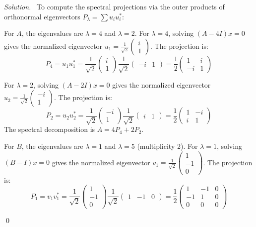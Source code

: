 \documentclass[12pt,a4paper]{article}
\newenvironment{solution}{%
  \par\noindent\textit{Solution.}\ }{\qed}
\theoremstyle{problemstyle}
\begin{document}
\begin{solution}
To compute the spectral projections via the outer products of orthonormal eigenvectors \( P_{\lambda} = \sum u_i u_i^* \):

For \( A \), the eigenvalues are \( \lambda = 4 \) and \( \lambda = 2 \).
For \( \lambda = 4 \), solving \( (A - 4I)x = 0 \) gives the normalized eigenvector \( u_1 = \frac{1}{\sqrt{2}}\begin{pmatrix} i \\ 1 \end{pmatrix} \). The projection is:
\[ P_4 = u_1 u_1^* = \frac{1}{\sqrt{2}}\begin{pmatrix} i \\ 1 \end{pmatrix} \frac{1}{\sqrt{2}}\begin{pmatrix} -i & 1 \end{pmatrix} = \frac{1}{2} \begin{pmatrix} 1 & i \\ -i & 1 \end{pmatrix} \]

For \( \lambda = 2 \), solving \( (A - 2I)x = 0 \) gives the normalized eigenvector \( u_2 = \frac{1}{\sqrt{2}}\begin{pmatrix} -i \\ 1 \end{pmatrix} \). The projection is:
\[ P_2 = u_2 u_2^* = \frac{1}{\sqrt{2}}\begin{pmatrix} -i \\ 1 \end{pmatrix} \frac{1}{\sqrt{2}}\begin{pmatrix} i & 1 \end{pmatrix} = \frac{1}{2} \begin{pmatrix} 1 & -i \\ i & 1 \end{pmatrix} \]
The spectral decomposition is \( A = 4P_4 + 2P_2 \).

For \( B \), the eigenvalues are \( \lambda = 1 \) and \( \lambda = 5 \) (multiplicity 2).
For \( \lambda = 1 \), solving \( (B - I)x = 0 \) gives the normalized eigenvector \( v_1 = \frac{1}{\sqrt{2}}\begin{pmatrix} 1 \\ -1 \\ 0 \end{pmatrix} \). The projection is:
\[ P_1 = v_1 v_1^* = \frac{1}{\sqrt{2}}\begin{pmatrix} 1 \\ -1 \\ 0 \end{pmatrix} \frac{1}{\sqrt{2}}\begin{pmatrix} 1 & -1 & 0 \end{pmatrix} = \frac{1}{2} \begin{pmatrix} 1 & -1 & 0 \\ -1 & 1 & 0 \\ 0 & 0 & 0 \end{pmatrix} \]


\end{solution}
\end{document}
